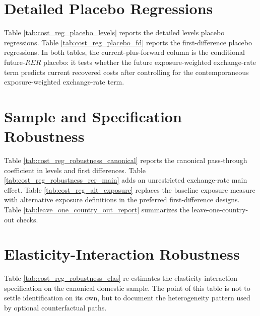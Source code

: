 \documentclass[11pt]{article}
\begin{document}
\section*{Detailed Placebo Regressions}

Table \ref{tab:cost_reg_placebo_levels} reports the detailed levels placebo regressions. Table \ref{tab:cost_reg_placebo_fd} reports the first-difference placebo regressions. In both tables, the current-plus-forward column is the conditional future-\(RER\) placebo: it tests whether the future exposure-weighted exchange-rate term predicts current recovered costs after controlling for the contemporaneous exposure-weighted exchange-rate term.



\clearpage



\section*{Sample and Specification Robustness}

Table \ref{tab:cost_reg_robustness_canonical} reports the canonical pass-through coefficient in levels and first differences. Table \ref{tab:cost_reg_robustness_rer_main} adds an unrestricted exchange-rate main effect. Table \ref{tab:cost_reg_alt_exposure} replaces the baseline exposure measure with alternative exposure definitions in the preferred first-difference designs. Table \ref{tab:leave_one_country_out_report} summarizes the leave-one-country-out checks.



\clearpage



\clearpage





\section*{Elasticity-Interaction Robustness}

Table \ref{tab:cost_reg_robustness_elas} re-estimates the elasticity-interaction specification on the canonical domestic sample. The point of this table is not to settle identification on its own, but to document the heterogeneity pattern used by optional counterfactual paths.
\end{document}
